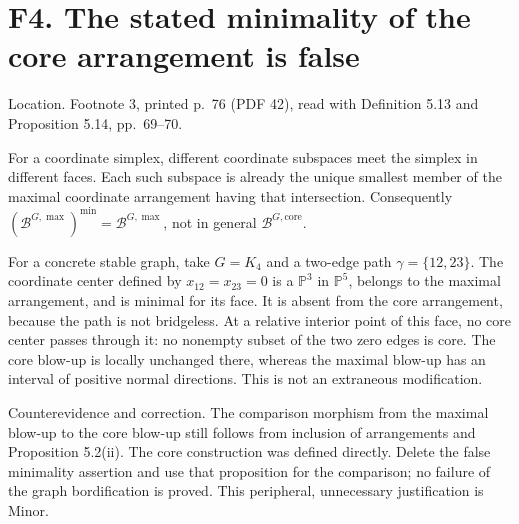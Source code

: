 \documentclass[10pt]{article}
\begin{document}
\section*{F4. The stated minimality of the core arrangement is false}
Location. Footnote 3, printed p. 76 (PDF 42), read with Definition 5.13 and Proposition 5.14, pp. 69–70.\par
For a coordinate simplex, different coordinate subspaces meet the simplex in different faces. Each such subspace is already the unique smallest member of the maximal coordinate arrangement having that intersection. Consequently \((\mathcal B^{G,\max})^{\min}=\mathcal B^{G,\max}\), not in general \(\mathcal B^{G,\mathrm{core}}\).\par
For a concrete stable graph, take \(G=K_4\) and a two-edge path \(\gamma=\{12,23\}\). The coordinate center defined by \(x_{12}=x_{23}=0\) is a \(\mathbb P^3\) in \(\mathbb P^5\), belongs to the maximal arrangement, and is minimal for its face. It is absent from the core arrangement, because the path is not bridgeless. At a relative interior point of this face, no core center passes through it: no nonempty subset of the two zero edges is core. The core blow-up is locally unchanged there, whereas the maximal blow-up has an interval of positive normal directions. This is not an extraneous modification.\par
Counterevidence and correction. The comparison morphism from the maximal blow-up to the core blow-up still follows from inclusion of arrangements and Proposition 5.2(ii). The core construction was defined directly. Delete the false minimality assertion and use that proposition for the comparison; no failure of the graph bordification is proved. This peripheral, unnecessary justification is Minor.\par
\end{document}
